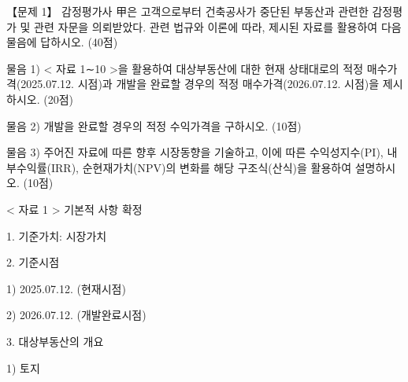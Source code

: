\begin{longquestion}{【문제 1】}
감정평가사 甲은 고객으로부터 건축공사가 중단된 부동산과 관련한 감정평가 및 관련 자문을 의뢰받았다. 관련 법규와 이론에 따라, 제시된 자료를 활용하여 다음 물음에 답하시오. (40점) \par
\medskip\noindent 물음 1) < 자료 1∼10 >을 활용하여 대상부동산에 대한 현재 상태대로의 적정 매수가격(2025.07.12. 시점)과 개발을 완료할 경우의 적정 매수가격(2026.07.12. 시점)을 제시하시오. (20점) \par
\medskip\noindent 물음 2) 개발을 완료할 경우의 적정 수익가격을 구하시오. (10점) \par
\medskip\noindent 물음 3) 주어진 자료에 따른 향후 시장동향을 기술하고, 이에 따른 수익성지수(PI), 내부수익률(IRR), 순현재가치(NPV)의 변화를 해당 구조식(산식)을 활용하여 설명하시오. (10점) \par
< 자료 1 > 기본적 사항 확정 \par
1. 기준가치: 시장가치 \par
2. 기준시점 \par
1) 2025.07.12. (현재시점) \par
2) 2026.07.12. (개발완료시점) \par
3. 대상부동산의 개요 \par
1) 토지 \par
{\small\centering
{}\par}


\end{longquestion}
